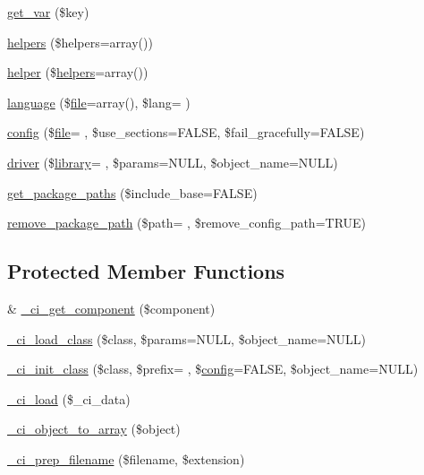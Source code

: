 \begin{DoxyCompactItemize}
\item 
\hyperlink{class_c_i___loader_a06567b423ba6d5b852808e581ef00fb0}{get\+\_\+var} (\$key)
\item 
\hyperlink{class_c_i___loader_a2c39d50f31ce66ffe936e4f68219e275}{helpers} (\$helpers=array())
\item 
\hyperlink{class_c_i___loader_a2da00ff269596262b62c0c6032b2996f}{helper} (\$\hyperlink{class_c_i___loader_a2c39d50f31ce66ffe936e4f68219e275}{helpers}=array())
\item 
\hyperlink{class_c_i___loader_a02a9f9b72bea7dc67355c850f919be71}{language} (\$\hyperlink{class_c_i___loader_a47e4b8eda2bbf9e8bb505cdafb8e4ba5}{file}=array(), \$lang= \textquotesingle{}\textquotesingle{})
\item 
\hyperlink{class_c_i___loader_af9e3be49624baaef3ff7ac93fc0e7f99}{config} (\$\hyperlink{class_c_i___loader_a47e4b8eda2bbf9e8bb505cdafb8e4ba5}{file}= \textquotesingle{}\textquotesingle{}, \$use\+\_\+sections=F\+A\+L\+SE, \$fail\+\_\+gracefully=F\+A\+L\+SE)
\item 
\hyperlink{class_c_i___loader_a4490a2a9bb42a8bfb57446b831544a6c}{driver} (\$\hyperlink{class_c_i___loader_a107e711d913e6008ee5f4d557655afd3}{library}= \textquotesingle{}\textquotesingle{}, \$params=N\+U\+LL, \$object\+\_\+name=N\+U\+LL)
\item 
\hyperlink{class_c_i___loader_a645d5b65ec991d936d864e8af01485e7}{get\+\_\+package\+\_\+paths} (\$include\+\_\+base=F\+A\+L\+SE)
\item 
\hyperlink{class_c_i___loader_a201b769bd98ad90d37521dff960a6839}{remove\+\_\+package\+\_\+path} (\$path= \textquotesingle{}\textquotesingle{}, \$remove\+\_\+config\+\_\+path=T\+R\+UE)
\end{DoxyCompactItemize}
\subsection*{Protected Member Functions}
\begin{DoxyCompactItemize}
\item 
\& \hyperlink{class_c_i___loader_a189d7f497e55c20fb9f82b065c20e402}{\+\_\+ci\+\_\+get\+\_\+component} (\$component)
\item 
\hyperlink{class_c_i___loader_ad5e557570063bdce07595a06643d6b12}{\+\_\+ci\+\_\+load\+\_\+class} (\$class, \$params=N\+U\+LL, \$object\+\_\+name=N\+U\+LL)
\item 
\hyperlink{class_c_i___loader_aa7807101f5503fe3e53b3e917dd72a63}{\+\_\+ci\+\_\+init\+\_\+class} (\$class, \$prefix= \textquotesingle{}\textquotesingle{}, \$\hyperlink{class_c_i___loader_af9e3be49624baaef3ff7ac93fc0e7f99}{config}=F\+A\+L\+SE, \$object\+\_\+name=N\+U\+LL)
\item 
\hyperlink{class_c_i___loader_ae3b5045c81f69c90afc7e918ff664d37}{\+\_\+ci\+\_\+load} (\$\+\_\+ci\+\_\+data)
\item 
\hyperlink{class_c_i___loader_ab000c31996cf4b8750f2c1d66aa8413b}{\+\_\+ci\+\_\+object\+\_\+to\+\_\+array} (\$object)
\item 
\hyperlink{class_c_i___loader_afbd52d4d271057334cb076106b50a327}{\+\_\+ci\+\_\+prep\+\_\+filename} (\$filename, \$extension)
\end{DoxyCompactItemize}
